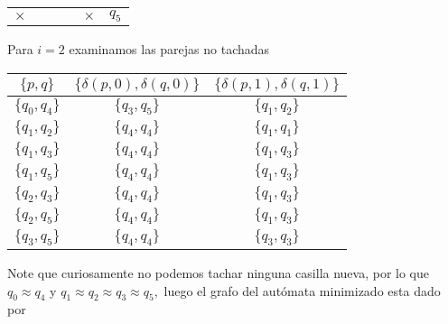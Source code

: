 \begin{itemize}
\begin{center}
\begin{tabular}{cccccc}
                    \multicolumn{1}{|c|}{$\times$} & \multicolumn{1}{|c|}{} & \multicolumn{1}{|c|}{} & \multicolumn{1}{|c|}{} & \multicolumn{1}{|c|}{$\times$} & $q_5$ \\ \cline{1-5}
                 \end{tabular}
             \end{center}
             Para $i=2$ examinamos las parejas no tachadas
             \begin{center}
                \begin{tabular}{c||c|c}
                  $\{p,q\}$ & $\{\delta(p,0),\delta(q,0)\}$ & $\{\delta(p,1),\delta(q,1)\}$\\ \hline
                  $\{q_0,q_4\}$ & $\{q_3,q_5\}$ & $\{q_1,q_2\}$ \\ \hline
                  $\{q_1,q_2\}$ & $\{q_4,q_4\}$ & $\{q_1,q_1\}$ \\ \hline
                  $\{q_1,q_3\}$ & $\{q_4,q_4\}$ & $\{q_1,q_3\}$ \\ \hline
                  $\{q_1,q_5\}$ & $\{q_4,q_4\}$ & $\{q_1,q_3\}$ \\ \hline
                  $\{q_2,q_3\}$ & $\{q_4,q_4\}$ & $\{q_1,q_3\}$ \\ \hline
                  $\{q_2,q_5\}$ & $\{q_4,q_4\}$ & $\{q_1,q_3\}$ \\ \hline
                  $\{q_3,q_5\}$ & $\{q_4,q_4\}$ & $\{q_3,q_3\}$ \\ \hline
                \end{tabular}
            \end{center}
            Note que curiosamente no podemos tachar ninguna casilla nueva, por lo que $q_0 \approx q_4$ y $q_1\approx q_2\approx q_3\approx q_5,$ luego el grafo del autómata minimizado esta dado por
            \begin{basedtikz}
             \centering
         \end{basedtikz}


\end{itemize}
